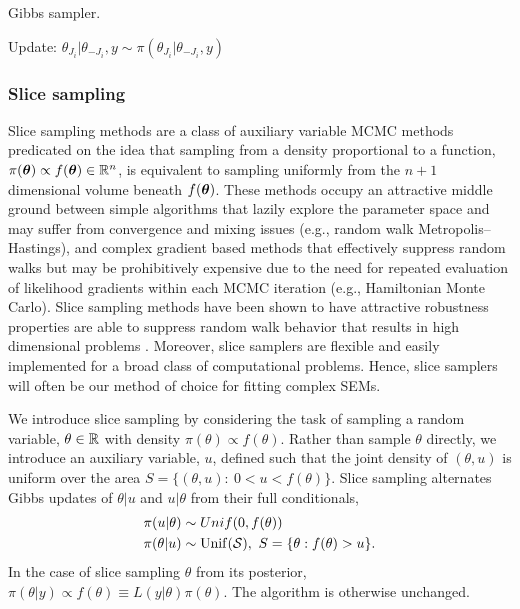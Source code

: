 \begin{algorithm}[htbp]
	\caption{Gibbs sampler.}
	\label{alg:gibbs}
	\begin{algorithmic}[1]
			\State Update: $ \theta_{J_i}|\theta_{-J_i},y\sim\pi(\theta_{J_i}|\theta_{-J_i},y) $
		\EndFor
		\EndProcedure
	\end{algorithmic}
\end{algorithm}

\subsubsection{Slice sampling}
\label{subsubsec:slice_sampling}

Slice sampling methods are a class of auxiliary variable MCMC methods predicated on the idea that sampling from a density proportional to a function, $ \pi(\boldsymbol{\theta})\propto f(\boldsymbol{\theta}) \in \mathbb{R}^n $, is equivalent to sampling uniformly from the $ n+1 $ dimensional volume beneath $ f(\boldsymbol{\theta}) $. These methods occupy an attractive middle ground between simple algorithms that lazily explore the parameter space and may suffer from convergence and mixing issues (e.g., random walk Metropolis--Hastings), and complex gradient based methods that effectively suppress random walks but may be prohibitively expensive due to the need for repeated evaluation of likelihood gradients within each MCMC iteration (e.g., Hamiltonian Monte Carlo). Slice sampling methods have been shown to have attractive robustness properties are able to suppress random walk behavior that results in high dimensional problems \cite{mira2002efficiency,roberts1999convergence,neal2003slice}. Moreover, slice samplers are flexible and easily implemented for a broad class of computational problems. Hence, slice samplers will often be our method of choice for fitting complex SEMs. 

We introduce slice sampling by considering the task of sampling a random variable, $ \theta\in\mathbb{R} $ with density $ \pi(\theta)\propto f(\theta) $.  Rather than sample $ \theta $ directly, we introduce an auxiliary variable, $ u $, defined such that the joint density of $ (\theta,u) $ is uniform over the area $ S = \lbrace (\theta,u):\ 0<u<f(\theta) \rbrace. $ Slice sampling alternates Gibbs updates of $ \theta|u $ and $ u|\theta $ from their full conditionals,
\begin{align*}
\pi(u|\theta) &\sim Unif(0,f(\theta)) \\
\pi(\theta|u) &\sim \mathrm{Unif}(\mathcal{S}),\ S = \lbrace \theta: f(\theta) > u\rbrace.
\end{align*}
In the case of slice sampling $ \theta $ from its posterior, $ \pi(\theta|y)\propto f(\theta) \equiv L(y|\theta)\pi(\theta) $. The algorithm is otherwise unchanged. 


